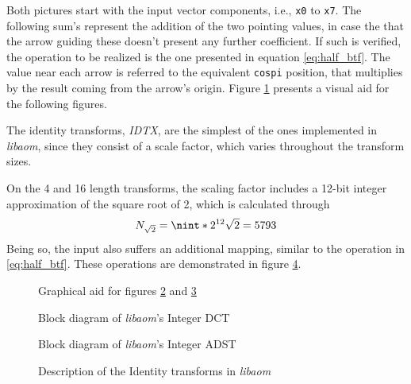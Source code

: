 Both pictures start with the input vector components, i.e., \texttt{x0} to \texttt{x7}. The following sum's represent the addition of the two pointing values, in case the that the arrow guiding these doesn't present any further coefficient. If such is verified, the operation to be realized is the one presented in equation \ref{eq:half_btf}. The value near each arrow is referred to the equivalent \texttt{cospi} position, that multiplies by the result coming from the arrow's origin. Figure \ref{fig:aid} presents a visual aid for the following figures.

The identity transforms, \emph{IDTX}, are the simplest of the ones implemented in \emph{libaom}, since they consist of a scale factor, which varies throughout the transform sizes.

On the 4 and 16 length transforms, the scaling factor includes a 12-bit integer approximation of the square root of 2, which is calculated through
\begin{equation}
    N_{\sqrt{2}}=\nint*{2^{12}\sqrt{2}}=5793
\end{equation}
Being so, the input also suffers an additional mapping, similar to the operation in \ref{eq:half_btf}. These operations are demonstrated in figure \ref{fig:intIDEN}.

\begin{figure}[!htbp]
    \centering
    
    \caption{Graphical aid for figures \ref{fig:intDCT} and \ref{fig:intADST}}
    \label{fig:aid}
\end{figure}

\begin{figure}[!htbp]
    \centering
    
    \caption{Block diagram of \emph{libaom}'s Integer DCT}
    \label{fig:intDCT}
\end{figure}


\clearpage
\begin{landscape}
    \vspace*{\fill}
    \begin{figure}[h]
        \centering
        
        \caption{Block diagram of \emph{libaom}'s Integer ADST}
        \label{fig:intADST}
    \end{figure}
    \vspace*{\fill}        
\end{landscape}


\begin{figure}[htbp]
    \centering
    
    \caption{Description of the Identity transforms in \emph{libaom}}
    \label{fig:intIDEN}
\end{figure}

